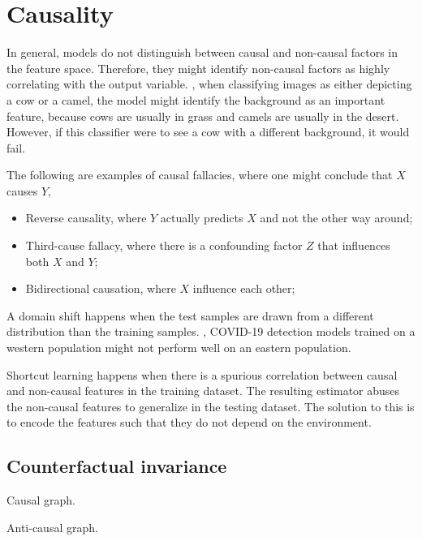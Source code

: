 \section{Causality}

In general, models do not distinguish between causal and non-causal factors in the feature space.
Therefore, they might identify non-causal factors as highly correlating with the output variable.
\Eg, when classifying images as either depicting a cow or a camel, the model might identify the
background as an important feature, because cows are usually in grass and camels are usually in the
desert. However, if this classifier were to see a cow with a different background, it would fail.

The following are examples of causal fallacies, where one might conclude that $X$ causes $Y$,
\begin{itemize}
    \item Reverse causality, where $Y$ actually predicts $X$ and not the other way around;
    \item Third-cause fallacy, where there is a confounding factor $Z$ that influences both $X$ and $Y$;
    \item Bidirectional causation, where $X$ influence each other;
\end{itemize}

A domain shift happens when the test samples are drawn from a different distribution than the
training samples. \Eg, COVID-19 detection models trained on a western population might not perform
well on an eastern population.

Shortcut learning happens when there is a spurious correlation between causal and non-causal
features in the training dataset. The resulting estimator abuses the non-causal features to
generalize in the testing dataset. The solution to this is to encode the features such that they do
not depend on the environment.

\subsection{Counterfactual invariance}

\begin{marginfigure}
    \centering
    \caption{Causal graph.}
    \label{fig:causal-graph}
\end{marginfigure}

\begin{marginfigure}
    \centering
    \caption{Anti-causal graph.}
    \label{fig:anti-causal-graph}
\end{marginfigure}

